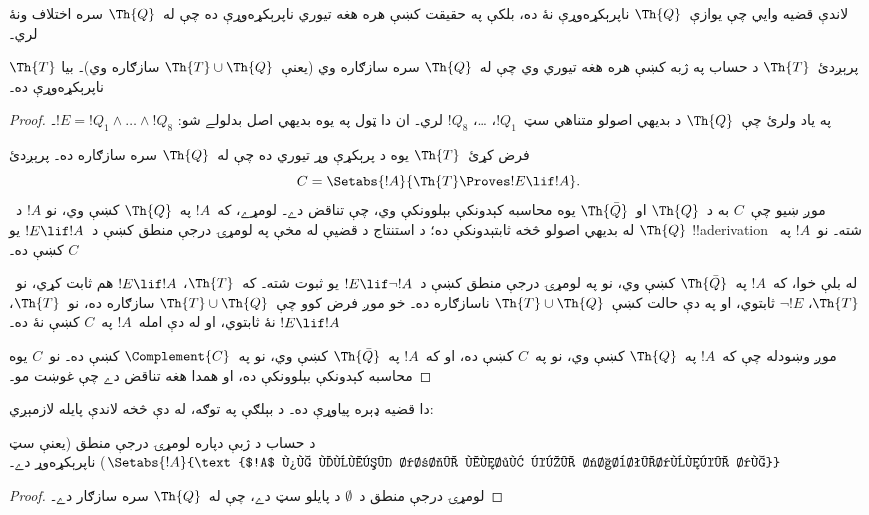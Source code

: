 \documentclass[../../../include/open-logic-section]{subfiles}
\begin{document}


لاندې قضيه وايي چې يوازې~$\Th{Q}$ ناپرېکړه‌وړې نۀ ده، بلکې په
حقيقت کښې هره هغه تيوري ناپرېکړه‌وړې ده چې له~$\Th{Q}$ سره اختلاف
ونۀ لري۔

\begin{thm}
پرېږدئ~$\Th{T}$ د حساب په ژبه کښې هره هغه تيوري وي چې له~$\Th{Q}$
سره سازګاره وي (يعنې~$\Th{T} \cup \Th{Q}$ سازګاره وي)۔ بيا
$\Th{T}$ ناپرېکړه‌وړې ده۔
\end{thm}

\begin{proof}
په ياد ولرئ چې~$\Th{Q}$ د بديهي اصولو متناهي سټ~$!Q_1$، \dots،
$!Q_8$ لري۔ ان دا ټول په يوه بديهي اصل بدلولے شو:
$!E = !Q_1 \land \dots \land !Q_8$۔

فرض کړئ~$\Th{T}$ يوه د پرېکړې وړ تيوري ده چې له~$\Th{Q}$ سره
سازګاره ده۔ پرېږدئ
\[
C = \Setabs{!A}{\Th{T} \Proves !E \lif !A}.
\]
موږ ښيو چې~$C$ به د~$\Th{Q}$ او~$\Th{\bar Q}$ يوه محاسبه کېدونکې
بېلوونکې وي، چې تناقض دے۔ لومړے، که~$!A$ په~$\Th{Q}$ کښې وي، نو
$!A$ د~$\Th{Q}$ له بديهي اصولو څخه ثابتېدونکې ده؛ د استنتاج د
قضيې له مخې په لومړۍ درجې منطق کښې د~$!E \lif !A$ يو
!!a{derivation} شته۔ نو~$!A$ په~$C$ کښې ده۔

له بلې خوا، که~$!A$ په~$\Th{\bar Q}$ کښې وي، نو په لومړۍ درجې
منطق کښې د~$!E \lif \lnot !A$ يو ثبوت شته۔ که~$\Th{T}$،
$!E \lif !A$ هم ثابت کړي، نو~$\Th{T}$، $\lnot !E$ ثابتوي، او په
دې حالت کښې~$\Th{T} \cup \Th{Q}$ ناسازګاره ده۔ خو موږ فرض کوو
چې~$\Th{T} \cup \Th{Q}$ سازګاره ده، نو~$\Th{T}$، $!E \lif !A$
نۀ ثابتوي، او له دې امله~$!A$ په~$C$ کښې نۀ ده۔

موږ وښودله چې که~$!A$ په~$\Th{Q}$ کښې وي، نو په~$C$ کښې ده، او
که~$!A$ په~$\Th{\bar Q}$ کښې وي، نو په~$\Complement{C}$ کښې ده۔
نو~$C$ يوه محاسبه کېدونکې بېلوونکې ده، او همدا هغه تناقض دے چې
غوښت مو۔
\end{proof}

دا قضيه ډېره پياوړې ده۔ د بېلګې په توګه، له دې څخه لاندې پايله
لازمېږي:

\begin{cor}
  د حساب د ژبې دپاره لومړۍ درجې منطق (يعنې سټ
  $\Setabs{!A}{\text{$!A$ په لومړۍ درجې منطق کښې ثابتېدونکې ده}}$)
  ناپرېکړه‌وړ دے۔
\end{cor}

\begin{proof}
لومړۍ درجې منطق د~$\emptyset$ د پايلو سټ دے، چې له~$\Th{Q}$ سره
سازګار دے۔
\end{proof}
\end{document}
